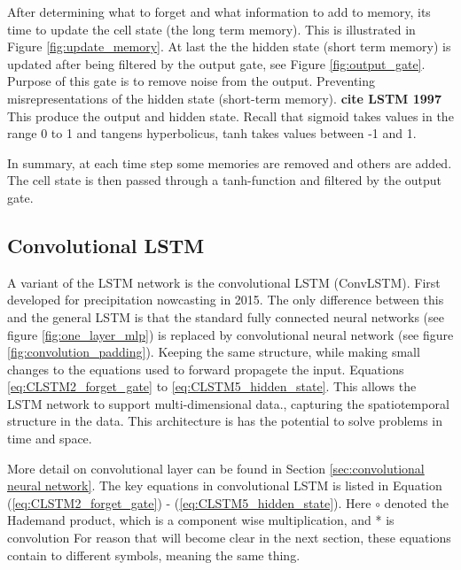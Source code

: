 \documentclass{article}
\begin{document}
After determining what to forget and what information to add to memory, its time to update the cell state (the long term memory). This is illustrated in Figure \ref{fig:update_memory}. At last the the hidden state (short term memory) is updated after being filtered by the output gate, see Figure \ref{fig:output_gate}. Purpose of this gate is to remove noise from the output. Preventing misrepresentations of the hidden state (short-term memory). \textbf{cite LSTM 1997} This produce the output and hidden state. Recall that sigmoid takes values in the range 0 to 1 and tangens hyperbolicus, tanh takes values between -1 and 1.

In summary, at each time step some memories are removed and others are added. The cell state is then passed through a tanh-function and filtered by the output gate. 

\subsection{Convolutional LSTM}  \label{sec:convolutional_lstm}
A variant of the LSTM network is the convolutional LSTM (ConvLSTM). First developed for precipitation nowcasting in 2015. The only difference between this and the general LSTM is that the standard fully connected neural networks (see figure \ref{fig:one_layer_mlp}) is replaced by convolutional neural network (see figure \ref{fig:convolution_padding}). Keeping the same structure, while making small changes to the equations used to forward propagete the input. Equations \eqref{eq:CLSTM2_forget_gate} to \eqref{eq:CLSTM5_hidden_state}.
This allows the LSTM network to support multi-dimensional data., capturing the spatiotemporal structure in the data. This architecture is has the potential to solve problems in time and space. 

More detail on convolutional layer can be found in Section \ref{sec:convolutional neural network}. The key equations in convolutional LSTM is listed in Equation (\ref{eq:CLSTM2_forget_gate}) - (\ref{eq:CLSTM5_hidden_state}). Here $\circ$ denoted the Hademand product, which is a component wise multiplication, and * is convolution
For reason that will become clear in the next section, these equations contain to different symbols, meaning the same thing.
\end{document}
